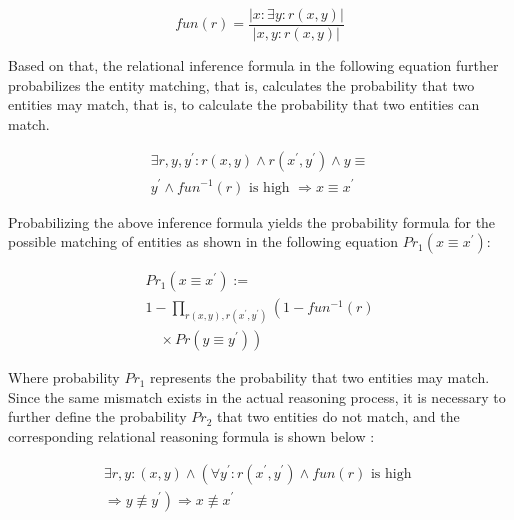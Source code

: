 \documentclass[sigconf]{acmart}
\begin{document}
{\begin{equation}
    \textit{fun}(r)=\frac{|x: \exists y: r(x, y)|}{|x, y: r(x, y)|}
\end{equation}

Based on that, the relational inference formula in the following equation further probabilizes the entity matching, that is, calculates the probability that two entities may match, that is, to calculate the probability that two entities can match. 

\begin{equation}
    \begin{array}{c}
        \exists r, y, y^{\prime}: r(x, y) \wedge r\left(x^{\prime}, y^{\prime}\right) \wedge y \equiv \\
        y^{\prime} \wedge f u n^{-1}(r) \text { is high } \Rightarrow x \equiv x^{\prime}
    \end{array}
\end{equation}

Probabilizing the above inference formula yields the probability formula for the possible matching of entities as shown in the following equation $\textit{Pr}_{1}(x \equiv x^{\prime})$: 

\begin{equation}
    \begin{array}{l}
\textit{Pr}_{1}\left(x \equiv x^{\prime}\right):= \\
1-\prod_{r(x, y), r\left(x^{\prime}, y^{\prime}\right)}\left(1-f u n^{-1}(r)\right. \\
\left.\quad \times \textit{Pr}\left(y \equiv y^{\prime}\right)\right)
\end{array}
\end{equation}

Where probability $Pr_1$ represents the probability that two entities may match. Since the same mismatch exists in the actual reasoning process, it is necessary to further define the probability $Pr_2$ that two entities do not match, and the corresponding relational reasoning formula is shown below : 

\begin{equation}
    \begin{array}{c}
\exists r, y:(x, y) \wedge\left(\forall y^{\prime}: r\left(x^{\prime}, y^{\prime}\right) \wedge f u n(r)\right. \text { is high } \\
\left.\Rightarrow y \not \equiv y^{\prime}\right) \Rightarrow x \not \equiv x^{\prime}
\end{array}
\end{equation}

}
\end{document}
